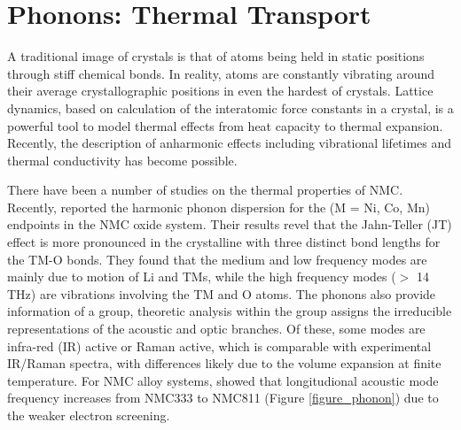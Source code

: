 \documentclass[journal=jacsat,manuscript=article]{achemso}
\begin{document}
\section*{Phonons: Thermal Transport}
 A traditional image of crystals is that of atoms  being held in static positions through stiff chemical bonds. 
 In reality, atoms are constantly vibrating around their average crystallographic positions in even the hardest of crystals.
  Lattice dynamics, based on calculation of the interatomic force constants in a crystal, is a powerful tool to model thermal effects from heat capacity to thermal expansion. 
  Recently, the description of anharmonic effects including vibrational lifetimes and thermal conductivity has become possible.

There have been a number of studies on the thermal properties of NMC. 
Recently, \citeauthor{yang2020chemical} reported the harmonic phonon dispersion for the  (M = Ni, Co, Mn) endpoints in the NMC oxide system. \cite{yang2020chemical} Their results revel that the Jahn-Teller (JT) effect is more pronounced in the crystalline  with three distinct bond lengths for the TM-O bonds. They found that the medium and low frequency modes are mainly due to motion of Li and TMs, while the high frequency modes ($>$ 14 THz) are vibrations involving the TM and O atoms. The phonons also provide information of a group, theoretic analysis within the group assigns the irreducible representations of the acoustic and optic branches. Of these, some modes are infra-red (IR) active or Raman active, which is comparable with experimental IR/Raman spectra, with differences likely due to the volume expansion at finite temperature. \cite{yang2019highly} For NMC alloy systems, \citeauthor{sun_electronic_2017} showed that longitudional acoustic mode frequency increases from NMC333 to NMC811 (Figure \ref{figure_phonon}) due to the weaker electron screening.\cite{sun_electronic_2017}
\end{document}
